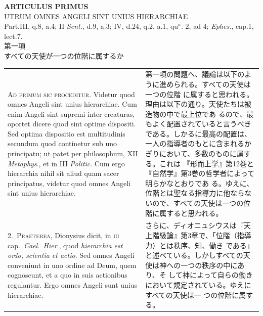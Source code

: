 \documentclass[paper=a4paper,fontsize=10pt,jafontsize=9pt,titlepage]{jlreq}
\begin{document}
\begin{center}
{\Large {\bfseries ARTICULUS PRIMUS}}\\
{\large UTRUM OMNES ANGELI SINT UNIUS HIERARCHIAE}\\
{\footnotesize Part.III, q.8, a.4; II {\itshape Sent.}, d.9, a.3; IV,
 d.24, q.2, a.1, qu$^{a}$. 2, ad 4; {\itshape Ephes.}, cap.1, lect.7.}\\
{\Large 第一項\\すべての天使が一つの位階に属するか}
\end{center}

\begin{longtable}{p{21em}p{21em}}

{\scshape Ad primum sic proceditur}. Videtur quod omnes Angeli sint unius
hierarchiae. Cum enim Angeli sint supremi inter creaturas, oportet
dicere quod sint optime dispositi. Sed optima dispositio est
multitudinis secundum quod continetur sub uno principatu; ut patet per
philosophum, XII {\itshape Metaphys}., et in III {\itshape Politic}. Cum ergo hierarchia
nihil sit aliud quam sacer principatus, videtur quod omnes Angeli sint
unius hierarchiae.

&

第一項の問題へ、議論は以下のように進められる。すべての天使は一つの位階
に属すると思われる。理由は以下の通り。天使たちは被造物の中で最上位であ
るので、最もよく配置されていると言うべきである。しかるに最高の配置は、
一人の指導者のもとに含まれるかぎりにおいて、多数のものに属する。これは
『形而上学』第12巻と『自然学』第3巻の哲学者によって明らかなとおりであ
る。ゆえに、位階とは聖なる指導力に他ならないので、すべての天使は一つの位
階に属すると思われる。

\\



2.~{\scshape Praeterea}, Dionysius dicit, in {\scshape iii} cap.~{\itshape Cael.~Hier}.,
quod {\itshape hierarchia est ordo, scientia et actio}. Sed omnes
Angeli conveniunt in uno ordine ad Deum, quem cognoscunt, et a quo in
suis actionibus regulantur. Ergo omnes Angeli sunt unius hierarchiae.

&

さらに、ディオニュシウスは『天上階級論』第3章で、「位階（指導力）とは秩序、知、働き
である」と述べている。しかしすべての天使は神への一つの秩序の中にあり、そ
して神によって自らの働きにおいて規定されている。ゆえにすべての天使は一
つの位階に属する。


\\



\end{longtable}
\end{document}
